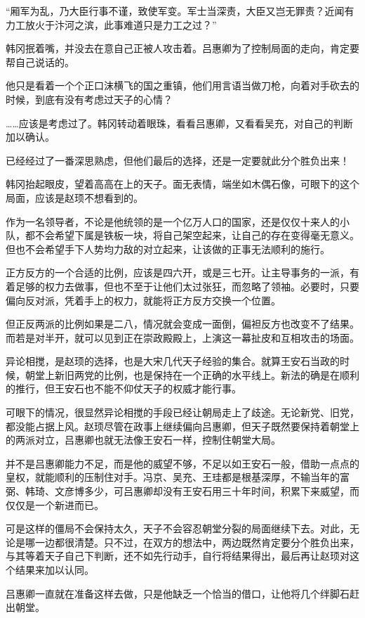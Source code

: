 “厢军为乱，乃大臣行事不谨，致使军变。军士当深责，大臣又岂无罪责？近闻有力工放火于汴河之滨，此事难道只是力工之过？”

韩冈抿着嘴，并没去在意自己正被人攻击着。吕惠卿为了控制局面的走向，肯定要帮自己说话的。

他只是看着一个个正口沫横飞的国之重镇，他们用言语当做刀枪，向着对手砍去的时候，到底有没有考虑过天子的心情？

……应该是考虑过了。韩冈转动着眼珠，看看吕惠卿，又看看吴充，对自己的判断加以确认。

已经经过了一番深思熟虑，但他们最后的选择，还是一定要就此分个胜负出来！

韩冈抬起眼皮，望着高高在上的天子。面无表情，端坐如木偶石像，可眼下的这个局面，应该是赵顼不想看到的。

作为一名领导者，不论是他统领的是一个亿万人口的国家，还是仅仅十来人的小队，都不会希望下属是铁板一块，将自己架空起来，让自己的存在变得毫无意义。但也不会希望手下人势均力敌的对立起来，让该做的正事无法顺利的施行。

正方反方的一个合适的比例，应该是四六开，或是三七开。让主导事务的一派，有着足够的权力去做事，但也不至于让他们太过张狂，而忽略了领袖。必要时，只要偏向反对派，凭着手上的权力，就能将正方反方交换一个位置。

但正反两派的比例如果是二八，情况就会变成一面倒，偏袒反方也改变不了结果。而若是对半开，就可以见到正在崇政殿殿上，上演这一幕扯皮和互相攻击的场面。

异论相搅，是赵顼的选择，也是大宋几代天子经验的集合。就算王安石当政的时候，朝堂上新旧两党的比例，也是保持在一个正确的水平线上。新法的确是在顺利的推行，但王安石也不能不仰仗天子的权威才能行事。

可眼下的情况，很显然异论相搅的手段已经让朝局走上了歧途。无论新党、旧党，都没能占据上风。赵顼尽管在政事上继续偏向吕惠卿，但天子既然要保持着朝堂上的两派对立，吕惠卿也就无法像王安石一样，控制住朝堂大局。

并不是吕惠卿能力不足，而是他的威望不够，不足以如王安石一般，借助一点点的皇权，就能顺利的压制住对手。冯京、吴充、王珪都是根基深厚，不输当年的富弼、韩琦、文彦博多少，可吕惠卿却没有王安石用三十年时间，积累下来威望，而仅仅是一个新进而已。

可是这样的僵局不会保持太久，天子不会容忍朝堂分裂的局面继续下去。对此，无论是哪一边都很清楚。只不过，在双方的想法中，两边既然肯定要分个胜负出来，与其等着天子自己下判断，还不如先行动手，自行将结果得出，最后再让赵顼对这个结果来加以认同。

吕惠卿一直就在准备这样去做，只是他缺乏一个恰当的借口，让他将几个绊脚石赶出朝堂。


